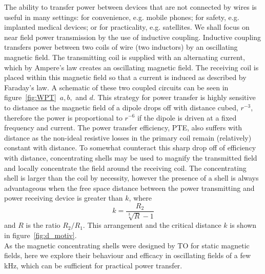 \documentclass[11pt]{iopart}
\begin{document}
The ability to transfer power between devices that are not connected
by wires is useful in many settings: for convenience, e.g. mobile
phones; for safety, e.g. implanted medical devices; or for
practicality, e.g. satellites. We shall focus on near field power
transmission by the use of inductive coupling. Inductive coupling
transfers power between two coils of wire (two inductors) by an
oscillating magnetic field.  The transmitting coil is supplied with an
alternating current, which by Ampere's law creates an oscillating
magnetic field. The receiving coil is placed within this magnetic
field so that a current is induced as described by Faraday's law. A
schematic of these two coupled circuits can be seen in
figure~\ref{fig:WPT}~$a, b,$ and $d$. This strategy for power transfer
is highly sensitive to distance as the magnetic field of a dipole
drops off with distance cubed, $r^{-3}$, therefore the power is
proportional to $r^{-6}$ if the dipole is driven at a fixed frequency
and current.  The power transfer efficiency, PTE, also suffers with
distance as the non-ideal resistive losses in the primary coil remain
(relatively) constant with distance. To somewhat counteract this sharp
drop off of efficiency with distance, concentrating shells may be used
to magnify the transmitted field and locally concentrate the field
around the receiving coil. The concentrating shell is larger than
the coil by necessity, however the presence of a shell is always
advantageous when the free space distance between the power
transmitting and power receiving device is greater than $k$,\cite{Prat2016} where
\begin{equation}
k = \frac{R_2}{\sqrt[3]{R}-1}
\end{equation}
and $R$ is the ratio $R_2/R_1$. This arrangement and the critical
distance $k$ is shown in figure~\ref{fig:d_motiv}.\\
As the magnetic concentrating shells were designed by TO for static
magnetic fields, here we explore their behaviour and efficacy in
oscillating fields of a few kHz, which can be sufficient for practical
power transfer\cite{Wang2005}.\\



\end{document}

